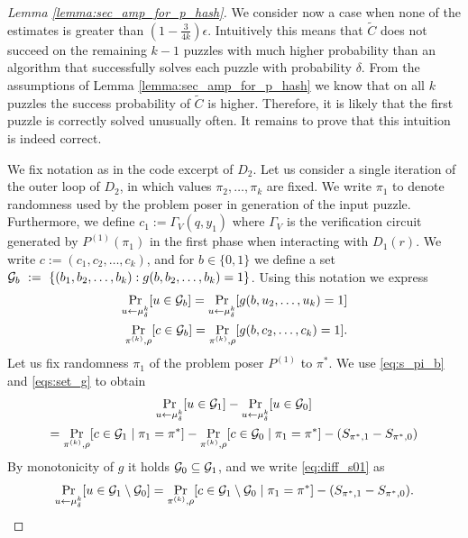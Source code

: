\begin{proof}[Lemma \ref{lemma:sec_amp_for_p_hash}]
We consider now a case when none of the estimates is greater than $(1-\frac{3}{4k})\epsilon$.
Intuitively this means that $\widetilde{C}$ does not succeed on the remaining $k-1$
puzzles with much higher probability than an algorithm that successfully solves each puzzle with probability $\delta$.
From the assumptions of Lemma \ref{lemma:sec_amp_for_p_hash} we know that on all
$k$ puzzles the success probability of $\widetilde{C}$ is higher.
Therefore, it is likely that the first puzzle is correctly solved unusually often.
It remains to prove that this intuition is indeed correct.

We fix notation as in the code excerpt of $D_2$. Let us consider a single iteration of the outer loop of $D_2$, in which values $\pi_2, \dotsc, \pi_k$ are fixed.
We write $\pi_1$ to denote randomness used by the problem poser in generation of the input puzzle.
Furthermore, we define $c_1 := \Gamma_V(q,y_1)$ where $\Gamma_V$ is the verification circuit generated
by $P^{(1)}(\pi_1)$ in the first phase when interacting with $D_1(r)$.
We write $c := (c_1, c_2, \dotsc, c_k)$, and for $b \in \{0,1\}$ we define a set $\mathcal{G}_{b}~:=~\{(b_1, b_2, \dots, b_k) : g(b, b_2, \dots, b_k) = 1 \}$.
Using this notation we express
\begin{align}
  \label{eqs:set_g}
  \underset{u \leftarrow \mu_{\delta}^k}{\Pr}[u \in \mathcal{G}_b] = \underset{u \leftarrow \mu_{\delta}^k}{\Pr}[g(b, u_2, \dots, u_k) = 1]\notag\\
 \underset{\pi^{(k)}, \rho}{\Pr}[c \in \mathcal{G}_b] = \underset{\pi^{(k)}, \rho}{\Pr}[g(b, c_2, \dots, c_k) = 1].
\end{align}
Let us fix randomness $\pi_1$ of the problem poser $P^{(1)}$ to $\pi^*$. We use \eqref{eq:s_pi_b} and \eqref{eqs:set_g} to obtain
\begin{multline}
\label{eq:diff_s01}
\underset{u \leftarrow \mu_{\delta}^k}{\Pr}[u \in \mathcal{G}_1] - \underset{u \leftarrow \mu_{\delta}^k}{\Pr}[u \in \mathcal{G}_0] \\
 = \underset{\pi^{(k)}, \rho}{\Pr}[c \in \mathcal{G}_1 \mid \pi_1 = \pi^*] - \underset{\pi^{(k)}, \rho}{\Pr}[c \in \mathcal{G}_0 \mid \pi_1 = \pi^*] - (S_{\pi^*, 1} - S_{\pi^*,0})
\end{multline}
By monotonicity of $g$ it holds $\mathcal{G}_0 \subseteq \mathcal{G}_1$, and we write \eqref{eq:diff_s01} as
\begin{align}
  \label{eq:diff_s01_next}
  \underset{u \leftarrow \mu_{\delta}^k}{\Pr}[u \in \cG_1 \setminus \cG_0] = \underset{\pi^{(k)}, \rho}{\Pr}[c \in \cG_1 \setminus \cG_0 \mid \pi_1 = \pi^*] - (S_{\pi^*,1} - S_{\pi^*,0}).

\end{align}
\end{proof}
